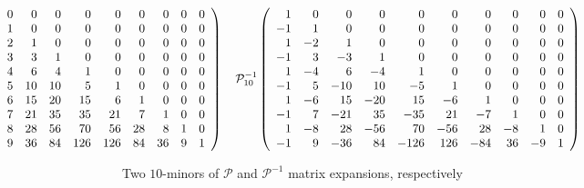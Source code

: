 

\begin{table}
    \begin{displaymath} 
        \hspace{-5cm}
        \mathcal{P}_{10}\left(\begin{array}{rrrrrrrrrr}
        1 & 0 & 0 & 0 & 0 & 0 & 0 & 0 & 0 & 0 \\
        1 & 1 & 0 & 0 & 0 & 0 & 0 & 0 & 0 & 0 \\
        1 & 2 & 1 & 0 & 0 & 0 & 0 & 0 & 0 & 0 \\
        1 & 3 & 3 & 1 & 0 & 0 & 0 & 0 & 0 & 0 \\
        1 & 4 & 6 & 4 & 1 & 0 & 0 & 0 & 0 & 0 \\
        1 & 5 & 10 & 10 & 5 & 1 & 0 & 0 & 0 & 0 \\
        1 & 6 & 15 & 20 & 15 & 6 & 1 & 0 & 0 & 0 \\
        1 & 7 & 21 & 35 & 35 & 21 & 7 & 1 & 0 & 0 \\
        1 & 8 & 28 & 56 & 70 & 56 & 28 & 8 & 1 & 0 \\
        1 & 9 & 36 & 84 & 126 & 126 & 84 & 36 & 9 & 1
        \end{array}\right) 
        \quad
        \mathcal{P}_{10}^{-1}\left(\begin{array}{rrrrrrrrrr}
        1 & 0 & 0 & 0 & 0 & 0 & 0 & 0 & 0 & 0 \\
        -1 & 1 & 0 & 0 & 0 & 0 & 0 & 0 & 0 & 0 \\
        1 & -2 & 1 & 0 & 0 & 0 & 0 & 0 & 0 & 0 \\
        -1 & 3 & -3 & 1 & 0 & 0 & 0 & 0 & 0 & 0 \\
        1 & -4 & 6 & -4 & 1 & 0 & 0 & 0 & 0 & 0 \\
        -1 & 5 & -10 & 10 & -5 & 1 & 0 & 0 & 0 & 0 \\
        1 & -6 & 15 & -20 & 15 & -6 & 1 & 0 & 0 & 0 \\
        -1 & 7 & -21 & 35 & -35 & 21 & -7 & 1 & 0 & 0 \\
        1 & -8 & 28 & -56 & 70 & -56 & 28 & -8 & 1 & 0 \\
        -1 & 9 & -36 & 84 & -126 & 126 & -84 & 36 & -9 & 1
        \end{array}\right) 
    \end{displaymath}

  \caption[$\mathcal{P}$ and $\mathcal{P}^{-1}$]{Two $10$-minors of
  $\mathcal{P}$ and $\mathcal{P}^{-1}$ matrix expansions, respectively}

  \label{tab:pascal:array} 
  
  \end{table}



